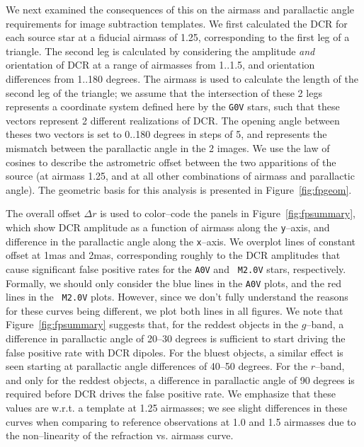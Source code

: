 \documentclass[prd, nofootinbib, floatfix, 11pt, tightenlines, times]{article}
\begin{document}
We next examined the consequences of this on the airmass and
parallactic angle requirements for image subtraction templates.  We
first calculated the DCR for each source star at a fiducial airmass of
1.25, corresponding to the first leg of a triangle.  The second leg is
calculated by considering the amplitude {\it and} orientation of DCR
at a range of airmasses from 1..1.5, and orientation differences from
1..180 degrees.  The airmass is used to calculate the length of the
second leg of the triangle; we assume that the intersection of these 2
legs represents a coordinate system defined here by the {\tt G0V}
stars, such that these vectors represent 2 different realizations of
DCR.  The opening angle between theses two vectors is set to 0..180
degrees in steps of 5, and represents the mismatch between the
parallactic angle in the 2 images.  We use the law of cosines to
describe the astrometric offset between the two apparitions of the
source (at airmass 1.25, and at all other combinations of airmass and
parallactic angle).  The geometric basis for this analysis is
presented in Figure~\ref{fig:fpgeom}.

The overall offset $\Delta r$ is used to color--code the panels in
Figure~\ref{fig:fpsummary}, which show DCR amplitude as a function of
airmass along the {\tt y}--axis, and difference in the parallactic
angle along the {\tt x}--axis.  We overplot lines of constant offset
at 1mas and 2mas, corresponding roughly to the DCR amplitudes that
cause significant false positive rates for the {\tt A0V} and {\tt
  M2.0V} stars, respectively.  Formally, we should only consider the
blue lines in the {\tt A0V} plots, and the red lines in the {\tt
  M2.0V} plots.  However, since we don't fully understand the reasons
for these curves being different, we plot both lines in all figures.
We note that Figure~\ref{fig:fpsummary} suggests that, for the reddest
objects in the $g$--band, a difference in parallactic angle of 20--30
degrees is sufficient to start driving the false positive rate with
DCR dipoles.  For the bluest objects, a similar effect is seen
starting at parallactic angle differences of 40--50 degrees.  For the
$r$--band, and only for the reddest objects, a difference in
parallactic angle of 90 degrees is required before DCR drives the
false positive rate.  We emphasize that these values are w.r.t. a
template at 1.25 airmasses; we see slight differences in these curves
when comparing to reference observations at 1.0 and 1.5 airmasses due
to the non--linearity of the refraction vs. airmass curve.
\end{document}
